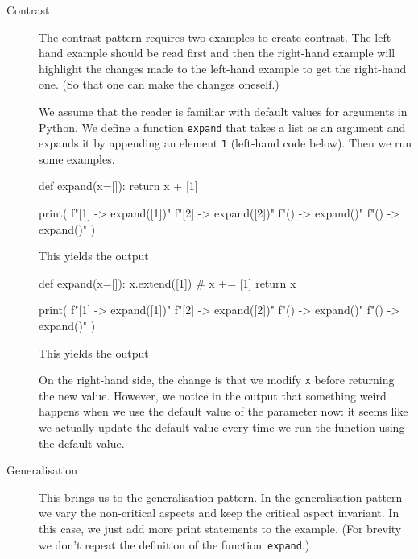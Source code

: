 \begin{description}
  \item[Contrast] The contrast pattern requires two examples to create 
    contrast.
    The left-hand example should be read first and then the right-hand 
    example will highlight the changes made to the left-hand example to get 
    the right-hand one.
    (So that one can make the changes oneself.)

    We assume that the reader is familiar with default values for arguments in 
    Python.
    We define a function \texttt{expand} that takes a list as an 
    argument and expands it by appending an element \texttt{1} 
    (left-hand code below).
    Then we run some examples.

    \begin{minipage}[t]{0.45\columnwidth}
      \begin{pyblock}[default1]
def expand(x=[]):
  return x + [1]


print(
  f"[1] -> {expand([1])}\n"
  f"[2] -> {expand([2])}\n"
  f"()  -> {expand()}\n"
  f"()  -> {expand()}\n"
)
      \end{pyblock}
      This yields the output
      \printpythontex[verbatim]
    \end{minipage}
    \hfill
    \begin{minipage}[t]{0.45\columnwidth}
      \begin{pyblock}[default2][highlightlines={2-3}]
def expand(x=[]):
  x.extend([1]) # x += [1]
  return x

print(
  f"[1] -> {expand([1])}\n"
  f"[2] -> {expand([2])}\n"
  f"()  -> {expand()}\n"
  f"()  -> {expand()}\n"
)
      \end{pyblock}
      This yields the output
      \printpythontex[verbatim][highlightlines={4}]
    \end{minipage}

    On the right-hand side, the change is that we modify \texttt{x} 
    before returning the new value.
    However, we notice in the output that something weird happens when we use 
    the default value of the parameter now:
    it seems like we actually update the default value every time we run the 
    function using the default value.

  \item[Generalisation] This brings us to the generalisation pattern.
    In the generalisation pattern we vary the non-critical aspects and keep the 
    critical aspect invariant.
    In this case, we just add more print statements to the example.
    (For brevity we don't repeat the definition of the 
    function~\texttt{expand}.)


\end{description}
